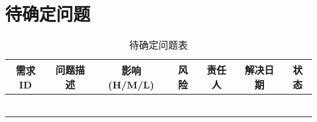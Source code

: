 \chapter{待确定问题}
\begin{table}[htbp]
\centering
\caption{待确定问题表} \label{tab:tbd_problems}
\begin{tabular}{|c|c|c|c|c|c|c|}
    \hline
    需求ID & 问题描述 & 影响(H/M/L) & 风险 & 责任人 & 解决日期 & 状态 \\
    \hline
     &  &  &  &  &  & \\
    \hline
     &  &  &  &  &  & \\
    \hline
     &  &  &  &  &  & \\
    \hline
     &  &  &  &  &  & \\
    \hline
     &  &  &  &  &  & \\
    \hline
     &  &  &  &  &  & \\
    \hline
\end{tabular}
\end{table}